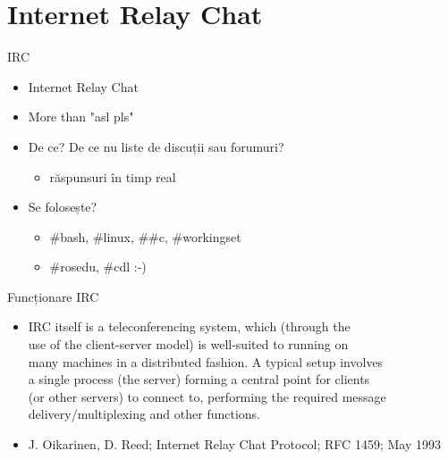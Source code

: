 \documentclass{beamer}
\begin{document}
\section{Internet Relay Chat}
    \begin{frame}{IRC}
    \begin{itemize}
    \setlength{\itemsep}{0.5cm}
    \item Internet Relay Chat
    \item More than "asl pls"
    \item<2-> De ce? De ce nu liste de discuții sau forumuri?
        \begin{itemize}
        \setlength{\itemsep}{0.2cm}
        \item<3-> răspunsuri în timp real
        \end{itemize}
    \item<4-> Se folosește?
        \begin{itemize}
        \setlength{\itemsep}{0.2cm}
        \item<5-> \#bash, \#linux, \#\#c, \#workingset
        \item<5-> \#rosedu, \#cdl :-)
        \end{itemize}
    \end{itemize}
    \end{frame}

    \begin{frame}{Funcționare IRC}
    \begin{itemize}
    \setlength{\itemsep}{0.5cm}
    \item IRC itself is a teleconferencing system, which (through the \\
        use of the client-server model) is well-suited to running on \\
        many machines in a distributed fashion. A typical setup involves \\
        a single process (the server) forming a central point for clients \\
        (or other servers) to connect to, performing the required message \\
        delivery/multiplexing and other functions.
    \item J. Oikarinen, D. Reed; Internet Relay Chat Protocol; RFC 1459; May 1993
    \end{itemize}
    \end{frame}
\end{document}
